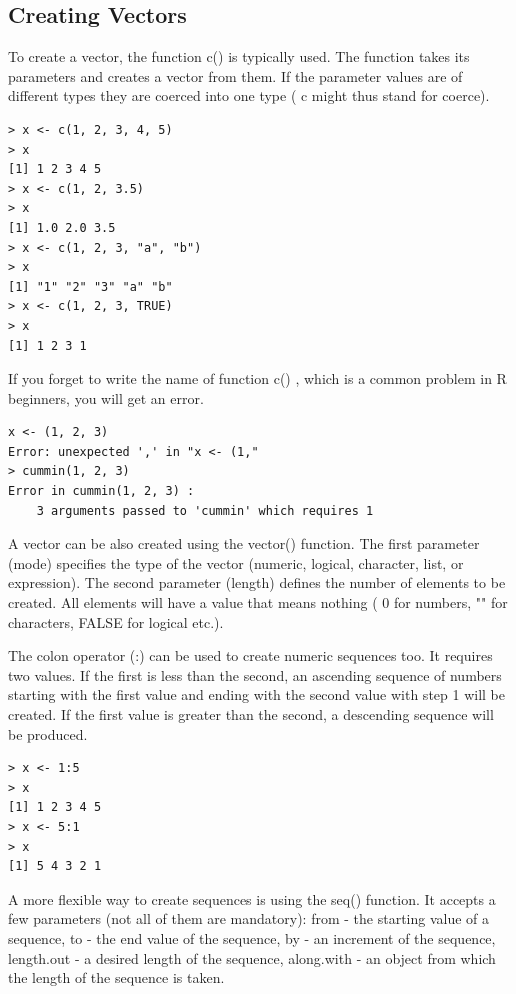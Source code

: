 \documentclass[11pt,openany,executivepaper]{book}
\begin{document}
\subsection{Creating Vectors}
To create a vector, the function c() is typically used. The function takes its parameters and creates a vector from them. If the parameter values are of different types they are coerced into one type ( c might thus stand for coerce).

\begin{verbatim}
> x <- c(1, 2, 3, 4, 5)
> x
[1] 1 2 3 4 5
> x <- c(1, 2, 3.5)
> x
[1] 1.0 2.0 3.5
> x <- c(1, 2, 3, "a", "b")
> x
[1] "1" "2" "3" "a" "b"
> x <- c(1, 2, 3, TRUE)
> x
[1] 1 2 3 1
\end{verbatim}

If you forget to write the name of function c() , which is a common problem in R beginners, you will get an error.

\begin{verbatim}
x <- (1, 2, 3)
Error: unexpected ',' in "x <- (1,"
> cummin(1, 2, 3)
Error in cummin(1, 2, 3) :
    3 arguments passed to 'cummin' which requires 1
\end{verbatim}

A vector can be also created using the vector() function. The first parameter (mode) specifies the type of the vector (numeric, logical, character, list, or expression). The second parameter (length) defines the number of elements to be created. All elements will have a value that means nothing ( 0 for numbers, "" for characters, FALSE for logical etc.).

The colon operator (:) can be used to create numeric sequences too. It requires two values. If the first is less than the second, an ascending sequence of numbers starting with the first value and ending with the second value with step 1 will be created. If the first value is greater than the second, a descending sequence will be produced.

\begin{verbatim}
> x <- 1:5
> x
[1] 1 2 3 4 5
> x <- 5:1
> x
[1] 5 4 3 2 1
\end{verbatim}

A more flexible way to create sequences is using the seq() function. It accepts a few parameters (not all of them are mandatory): from - the starting value of a sequence, to - the end value of the sequence, by - an increment of the sequence, length.out - a desired length of the sequence, along.with - an object from which the length of the sequence is taken.
\end{document}
